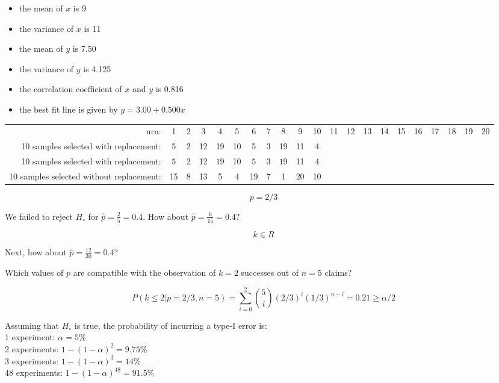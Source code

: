 \documentclass{article}
\begin{document}
\begin{itemize}
\item the mean of $x$ is 9
\item the variance of $x$ is 11
\item the mean of $y$ is 7.50
\item the variance of $y$ is 4.125
\item the correlation coefficient of $x$ and $y$ is 0.816
\item the best fit line is given by $y = 3.00 + 0.500 x$
\end{itemize}

\begin{tabular}{r|cccccccccccccccccccc}
  urn: & 1 & 2 & 3 & 4 & 5 & 6 & 7 & 8 & 9 & 10 &
  11 & 12 & 13 & 14 & 15 & 16 & 17 & 18 & 19 & 20 \\
  10 samples selected with replacement: &
  5 & 2 & 12 & 19 & 10 & 5 & 3 & 19 & 11 & 4
  & & & & & & & & & & \\
  10 samples selected with replacement: &
  $\boxed{5}$ & 2 & 12 & $\boxed{19}$ & 10 & $\boxed{5}$ & 3 & $\boxed{19}$ & 11 & 4
  & & & & & & & & & & \\
  10 samples selected without replacement: &
  15 & 8 & 13 & 5 & 4 & 19 & 7 & 1 & 20 & 10
  & & & & & & & & & & 
\end{tabular}

\[
p = 2/3
\]

We failed to reject $H_\circ$ for $\hat{p}=\frac{2}{5}=0.4$. How about
$\hat{p}=\frac{6}{15}=0.4$?

\[
k \in R
\]

Next, how about $\hat{p}=\frac{12}{30}=0.4$?

Which values of $p$ are compatible with the observation of $k=2$
successes out of $n=5$ claims?

\[
P({k}\leq{2}|p=2/3,n=5) =
\sum\limits_{i=0}^{2}\binom{5}{i}(2/3)^i(1/3)^{n-i} = 0.21 \geq \alpha/2
\]

Assuming that $H_\circ$ is true, the probability of incurring a type-I
error is:\\

1 experiment: $\alpha = 5\%$\\

2 experiments: $1-(1-\alpha)^2=9.75\%$\\

3 experiments: $1-(1-\alpha)^3=14\%$\\

48 experiments:   $1-(1-\alpha)^{48}=91.5\%$\\
\end{document}
